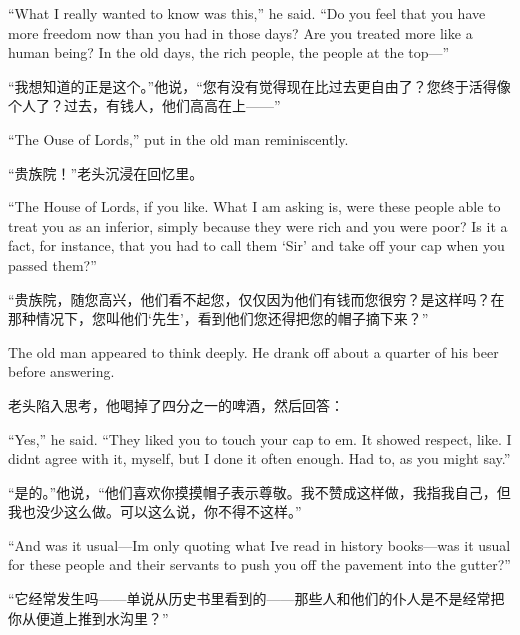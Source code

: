 \begin{paracol}{2}
``What I really wanted to know was this,'' he said. ``Do you feel that you
have more freedom now than you had in those days? Are you treated more
like a human being? In the old days, the rich people, the people at the
top---''

\switchcolumn

``我想知道的正是这个。''他说，``您有没有觉得现在比过去更自由了？您终于活得像个人了？过去，有钱人，他们高高在上——''

\switchcolumn*

``The \textquotesingle Ouse of Lords,'' put in the old man reminiscently.

\switchcolumn

``贵族院！''老头沉浸在回忆里。

\switchcolumn*

``The House of Lords, if you like. What I am asking is, were these people
able to treat you as an inferior, simply because they were rich and you
were poor? Is it a fact, for instance, that you had to call them
`Sir' and take off your cap when you
passed them?''

\switchcolumn

``贵族院，随您高兴，他们看不起您，仅仅因为他们有钱而您很穷？是这样吗？在那种情况下，您叫他们`先生'，看到他们您还得把您的帽子摘下来？''

\switchcolumn*

The old man appeared to think deeply. He drank off about a quarter of
his beer before answering.

\switchcolumn

老头陷入思考，他喝掉了四分之一的啤酒，然后回答：

\switchcolumn*

``Yes,'' he said. ``They liked you to touch your cap to
\textquotesingle em. It showed respect, like. I didn\textquotesingle t
agree with it, myself, but I done it often enough. Had to, as you might
say.''

\switchcolumn

``是的。''他说，``他们喜欢你摸摸帽子表示尊敬。我不赞成这样做，我指我自己，但我也没少这么做。可以这么说，你不得不这样。''

\switchcolumn*

``And was it usual---I\textquotesingle m only quoting what
I\textquotesingle ve read in history books---was it usual for these
people and their servants to push you off the pavement into the gutter?''

\switchcolumn

``它经常发生吗——单说从历史书里看到的——那些人和他们的仆人是不是经常把你从便道上推到水沟里？''


\end{paracol}
